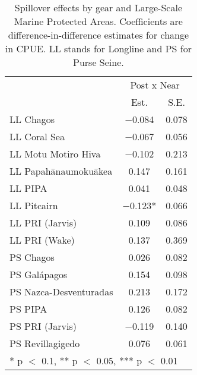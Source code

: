 \begin{table}

\caption{\label{tab:mpa_reg}Spillover effects by gear and Large-Scale Marine Protected Areas. Coefficients are
             difference-in-difference estimates for change in CPUE. LL stands for Longline and PS for Purse Seine.}
\centering
\begin{tabular}[t]{lcc}
\toprule
\multicolumn{1}{c}{ } & \multicolumn{2}{c}{Post x Near} \\
\cmidrule(l{3pt}r{3pt}){2-3}
  & Est. & S.E.\\
\midrule
LL Chagos & \num{-0.084} & \num{0.078}\\
LL Coral Sea & \num{-0.067} & \num{0.056}\\
LL Motu Motiro Hiva & \num{-0.102} & \num{0.213}\\
LL Papahānaumokuākea & \num{0.147} & \num{0.161}\\
LL PIPA & \num{0.041} & \num{0.048}\\
LL Pitcairn & \num{-0.123}* & \num{0.066}\\
LL PRI (Jarvis) & \num{0.109} & \num{0.086}\\
LL PRI (Wake) & \num{0.137} & \num{0.369}\\
PS Chagos & \num{0.026} & \num{0.082}\\
PS Galápagos & \num{0.154} & \num{0.098}\\
PS Nazca-Desventuradas & \num{0.213} & \num{0.172}\\
PS PIPA & \num{0.126} & \num{0.082}\\
PS PRI (Jarvis) & \num{-0.119} & \num{0.140}\\
PS Revillagigedo & \num{0.076} & \num{0.061}\\
\bottomrule
\multicolumn{3}{l}{\rule{0pt}{1em}* p $<$ 0.1, ** p $<$ 0.05, *** p $<$ 0.01}\\
\end{tabular}
\end{table}
